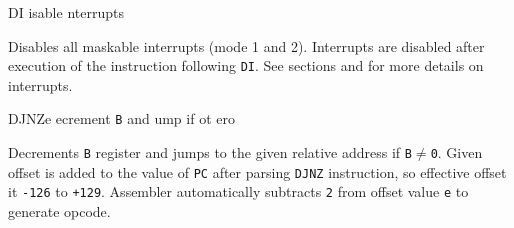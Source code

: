 \begin{basedescript}{
	\desclabelstyle{\multilinelabel}
	\desclabelwidth{3cm}}
	\begin{DetailItem}{DI}{}
		{isable nterrupts}
		{\SymDI}

		Disables all maskable interrupts (mode 1 and 2). Interrupts are disabled after execution of the instruction following {\tt DI}. See sections  and  for more details on interrupts.
		
		\begin{DetailEffects}
			\FlagsDI
		\end{DetailEffects}
				
		\begin{DetailTiming}
			\DetailTime{1}{4}
		\end{DetailTiming}

	\end{DetailItem}


	\begin{DetailItem}{DJNZ}{e}
		{ecrement {\tt B} and ump if ot \IH{Z}ero}
		{\SymDJNZ{e}}

		Decrements {\tt B} register and jumps to the given relative address if {\tt B$\neq$0}. Given offset is added to the value of {\tt PC} after parsing {\tt DJNZ} instruction, so effective offset it {\tt -126} to {\tt +129}. Assembler automatically subtracts {\tt 2} from offset value {\tt e} to generate opcode.

		\begin{DetailEffects}
			\FlagsDJNZ
		\end{DetailEffects}
				
		\begin{DetailTiming}
			\DetailTimeRegular[{\tt B}=0]{2}{8}
			\DetailTimeRegular[{\tt B}$\neq$0]{3}{13}
		\end{DetailTiming}

	\end{DetailItem}



\end{basedescript}
